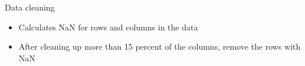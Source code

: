 \documentclass[
 size=14pt,
 paper=smartboard,  %
 mode=present, 		%
 display=slides, 	%
 style=tuliplab,  	%
 pauseslide,
 fleqn,leqno]{powerdot}
\begin{document}
\begin{slide}{Data cleaning}
\begin{itemize}
\item
Calculates NaN for rows and columns in the data
\item
After cleaning up more than 15 percent of the columns, remove the rows with NaN
\end{itemize}
\vspace{1cm}

\end{slide}
\end{document}
